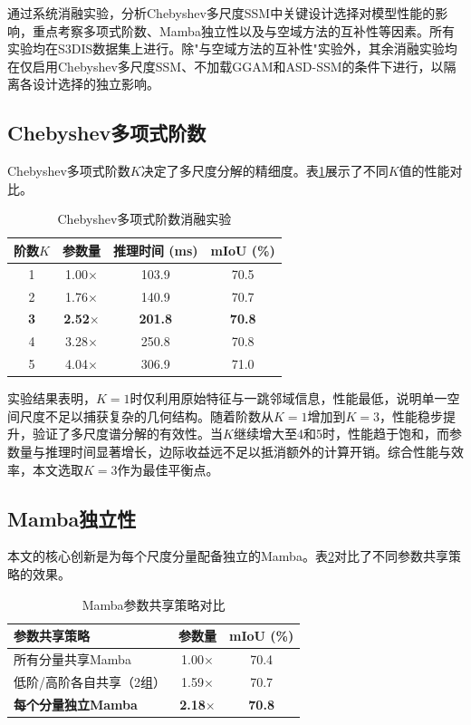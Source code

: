 通过系统消融实验，分析Chebyshev多尺度SSM中关键设计选择对模型性能的影响，重点考察多项式阶数、Mamba独立性以及与空域方法的互补性等因素。所有实验均在S3DIS数据集上进行。除"与空域方法的互补性"实验外，其余消融实验均在仅启用Chebyshev多尺度SSM、不加载GGAM和ASD-SSM的条件下进行，以隔离各设计选择的独立影响。

\subsection{Chebyshev多项式阶数}

Chebyshev多项式阶数$K$决定了多尺度分解的精细度。表\ref{tab:cheb_order}展示了不同$K$值的性能对比。

\begin{table}[htbp!]
\centering
\caption{Chebyshev多项式阶数消融实验}
\label{tab:cheb_order}
\begin{tabular}{@{}cccc@{}}
\toprule
阶数$K$ & 参数量 & 推理时间 (ms) & mIoU (\%) \\
\midrule
1 & 1.00$\times$ & 103.9 & 70.5 \\
2 & 1.76$\times$ & 140.9 & 70.7 \\
\textbf{3} & \textbf{2.52$\times$} & \textbf{201.8} & \textbf{70.8} \\
4 & 3.28$\times$ & 250.8 & 70.8 \\
5 & 4.04$\times$ & 306.9 & 71.0 \\
\bottomrule
\end{tabular}
\end{table}

实验结果表明，$K=1$时仅利用原始特征与一跳邻域信息，性能最低，说明单一空间尺度不足以捕获复杂的几何结构。随着阶数从$K=1$增加到$K=3$，性能稳步提升，验证了多尺度谱分解的有效性。当$K$继续增大至4和5时，性能趋于饱和，而参数量与推理时间显著增长，边际收益远不足以抵消额外的计算开销。综合性能与效率，本文选取$K=3$作为最佳平衡点。

\subsection{Mamba独立性}

本文的核心创新是为每个尺度分量配备独立的Mamba。表\ref{tab:mamba_sharing}对比了不同参数共享策略的效果。

\begin{table}[htbp!]
\centering
\caption{Mamba参数共享策略对比}
\label{tab:mamba_sharing}
\begin{tabular}{@{}lcc@{}}
\toprule
参数共享策略 & 参数量 & mIoU (\%) \\
\midrule
所有分量共享Mamba & 1.00$\times$ & 70.4 \\
低阶/高阶各自共享（2组） & 1.59$\times$ & 70.7 \\
\textbf{每个分量独立Mamba} & \textbf{2.18$\times$} & \textbf{70.8} \\
\bottomrule
\end{tabular}
\end{table}

